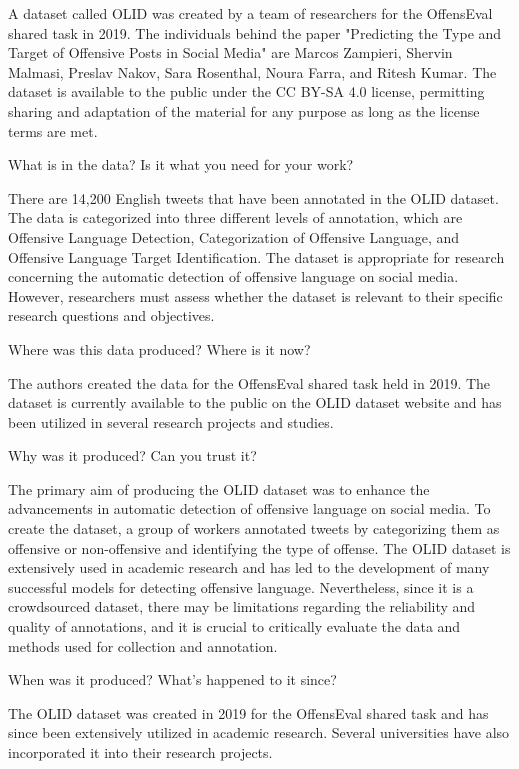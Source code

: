 \documentclass[11pt,a4paper]{article}
\begin{document}
    A dataset called OLID was created by a team of researchers for the OffensEval shared task in 2019. The individuals behind the paper "Predicting the Type and Target of Offensive Posts in Social Media" are Marcos Zampieri, Shervin Malmasi, Preslav Nakov, Sara Rosenthal, Noura Farra, and Ritesh Kumar. The dataset is available to the public under the CC BY-SA 4.0 license, permitting sharing and adaptation of the material for any purpose as long as the license terms are met.

    What is in the data? Is it what you need for your work?

    There are 14,200 English tweets that have been annotated in the OLID dataset. The data is categorized into three different levels of annotation, which are Offensive Language Detection, Categorization of Offensive Language, and Offensive Language Target Identification. The dataset is appropriate for research concerning the automatic detection of offensive language on social media. However, researchers must assess whether the dataset is relevant to their specific research questions and objectives.

    Where was this data produced? Where is it now?

    The authors created the data for the OffensEval shared task held in 2019. The dataset is currently available to the public on the OLID dataset website and has been utilized in several research projects and studies.

    Why was it produced? Can you trust it?

    The primary aim of producing the OLID dataset was to enhance the advancements in automatic detection of offensive language on social media. To create the dataset, a group of workers annotated tweets by categorizing them as offensive or non-offensive and identifying the type of offense. The OLID dataset is extensively used in academic research and has led to the development of many successful models for detecting offensive language. Nevertheless, since it is a crowdsourced dataset, there may be limitations regarding the reliability and quality of annotations, and it is crucial to critically evaluate the data and methods used for collection and annotation.

    When was it produced? What’s happened to it since?

    The OLID dataset was created in 2019 for the OffensEval shared task and has since been extensively utilized in academic research. Several universities have also incorporated it into their research projects.
\end{document}
